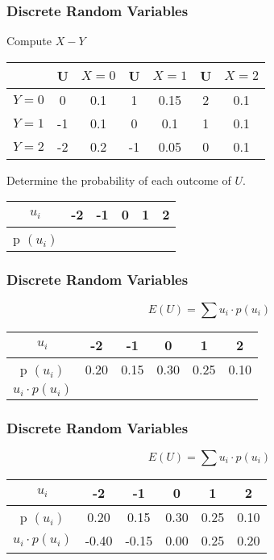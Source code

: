 \documentclass{beamer}
\begin{document}
\begin{frame}
\frametitle{Discrete Random Variables}
\Large
Compute $X-Y$
\begin{center}
\begin{tabular}{|c|cc|cc|cc|}
\hline  & \phantom{sp}U \phantom{s}&$X=0$ &\phantom{sp}U \phantom{s} & $X=1$ & \phantom{sp}U\phantom{s}& $X=2$ \\ 
\hline $Y=0$& 0 & 0.1 & 1 & 0.15 & 2& 0.1 \\ 
\hline $Y=1$& -1& 0.1 & 0& 0.1 & 1& 0.1 \\ 
\hline $Y=2$& -2 & 0.2 & -1 & 0.05 & 0 & 0.1 \\ 
\hline 
\end{tabular} 
\end{center}
\bigskip

Determine the probability of each outcome of $U$.
\\
\begin{center}
\begin{tabular}{|c|c|c|c|c|c|}
\hline $u_i$ & -2 & -1  & 0 & 1 & 2 \\ 
\hline p $(u_i)$ & \phantom{spaces} & \phantom{spaces} & \phantom{spaces} & \phantom{spaces} & \phantom{spaces} \\ 
\hline 
\end{tabular} 
\end{center}
\end{frame}
\begin{frame}
\frametitle{Discrete Random Variables}
\Large
\vspace{-1.5cm}
\[ E(U) =  \sum  u_i \cdot p(u_i)   \]
\begin{center}
\begin{tabular}{|c|c|c|c|c|c|}
\hline $u_i$ & -2 & -1  & 0 & 1 & 2 \\ 
\hline p $(u_i)$ & \phantom{s}0.20\phantom{s} & \phantom{s}0.15\phantom{s}  & \phantom{s}0.30\phantom{s}  & \phantom{s}0.25\phantom{s} & \phantom{s}0.10\phantom{s} \\ 
\hline 
$u_i \cdot p (u_i)$ & & & & & \\\hline
\end{tabular} 
\end{center}
\end{frame}
\begin{frame}
\frametitle{Discrete Random Variables}
\Large
\vspace{-1.5cm}
\[ E(U) =  \sum  u_i \cdot p(u_i)   \]
\begin{center}
\begin{tabular}{|c|c|c|c|c|c|}
\hline $u_i$ & -2 & -1  & 0 & 1 & 2 \\ 
\hline p $(u_i)$ & \phantom{s}0.20\phantom{s} & \phantom{s}0.15\phantom{s}  & \phantom{s}0.30\phantom{s}  & \phantom{s}0.25\phantom{s} & \phantom{s}0.10\phantom{s} \\ 
\hline 
$u_i \cdot p (u_i)$ & -0.40 & -0.15 & 0.00 & 0.25 & 0.20 \\\hline
\end{tabular} 
\end{center}


\end{frame}
\end{document}
